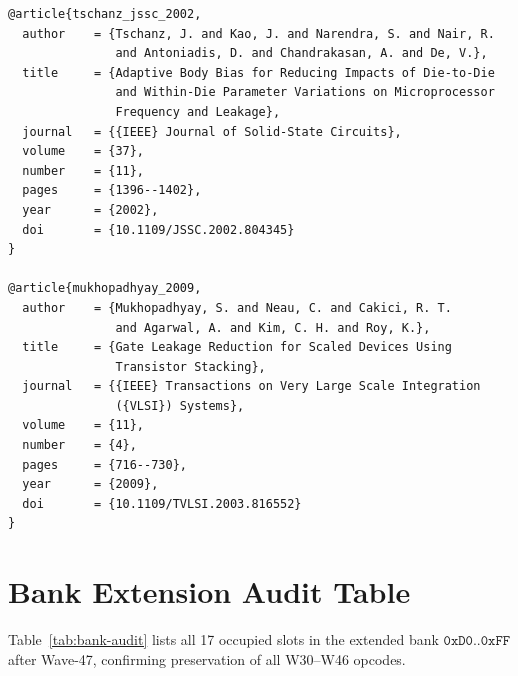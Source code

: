\begin{verbatim}
@article{tschanz_jssc_2002,
  author    = {Tschanz, J. and Kao, J. and Narendra, S. and Nair, R.
               and Antoniadis, D. and Chandrakasan, A. and De, V.},
  title     = {Adaptive Body Bias for Reducing Impacts of Die-to-Die
               and Within-Die Parameter Variations on Microprocessor
               Frequency and Leakage},
  journal   = {{IEEE} Journal of Solid-State Circuits},
  volume    = {37},
  number    = {11},
  pages     = {1396--1402},
  year      = {2002},
  doi       = {10.1109/JSSC.2002.804345}
}

@article{mukhopadhyay_2009,
  author    = {Mukhopadhyay, S. and Neau, C. and Cakici, R. T.
               and Agarwal, A. and Kim, C. H. and Roy, K.},
  title     = {Gate Leakage Reduction for Scaled Devices Using
               Transistor Stacking},
  journal   = {{IEEE} Transactions on Very Large Scale Integration
               ({VLSI}) Systems},
  volume    = {11},
  number    = {4},
  pages     = {716--730},
  year      = {2009},
  doi       = {10.1109/TVLSI.2003.816552}
}
\end{verbatim}

\section{Bank Extension Audit Table}
\label{app:bank-audit}

Table~\ref{tab:bank-audit} lists all 17 occupied slots in the extended bank
$\texttt{0xD0..0xFF}$ after Wave-47, confirming preservation of all
W30--W46 opcodes.

